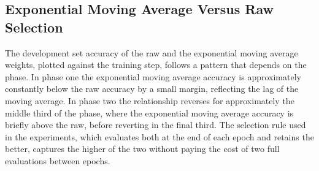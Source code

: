 \subsection{Exponential Moving Average Versus Raw Selection}

The development set accuracy of the raw and the exponential moving average weights, plotted against the training step, follows a pattern that depends on the phase. In phase one the exponential moving average accuracy is approximately constantly below the raw accuracy by a small margin, reflecting the lag of the moving average. In phase two the relationship reverses for approximately the middle third of the phase, where the exponential moving average accuracy is briefly above the raw, before reverting in the final third. The selection rule used in the experiments, which evaluates both at the end of each epoch and retains the better, captures the higher of the two without paying the cost of two full evaluations between epochs.
